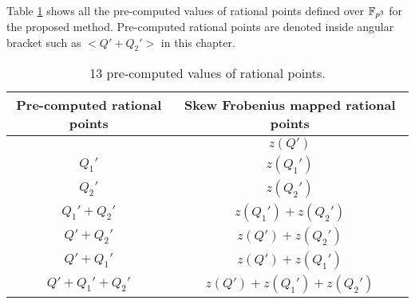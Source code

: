 Table \ref{table:pre-compute_chapter_g2scm_kss18} shows all the pre-computed values of rational points defined over $\mathbb{F}_{p^3}$ for the proposed method. 
Pre-computed rational points are denoted inside angular bracket such as $<Q'+Q_2'>$ in this chapter. 

\renewcommand{\baselinestretch}{1.5}
\begin{table}[!ht]
\centering
\caption{13 pre-computed values of rational points.}
\label{table:pre-compute_chapter_g2scm_kss18}
\begin{tabular}{|c|c|}
\hline 
 Pre-computed rational points & Skew Frobenius mapped rational points\\ 
\hline 
 & $z(Q')$ \\ 
\hline 
$Q_1'$ & $z(Q_1')$  \\ 
\hline 
$Q_2'$ & $z(Q_2')$ \\ 
\hline 
$Q_1'+Q_2'$ & \quad  $ z(Q_1')+ z(Q_2') $ \quad \\ 
\hline 
$Q'+Q_2'$ & $ z(Q')+ z(Q_2') $ \\ 
\hline 
$Q'+Q_1'$ & $  z(Q')+ z(Q_1') $ \\ 
\hline 
 \quad $Q'+Q_1'+Q_2'$ \quad  \quad &   \quad  $ z(Q')+ z(Q_1')+ z(Q_2')$  \quad \\ 
\hline 
\end{tabular} 
\end{table}
\renewcommand{\baselinestretch}{1.0}

